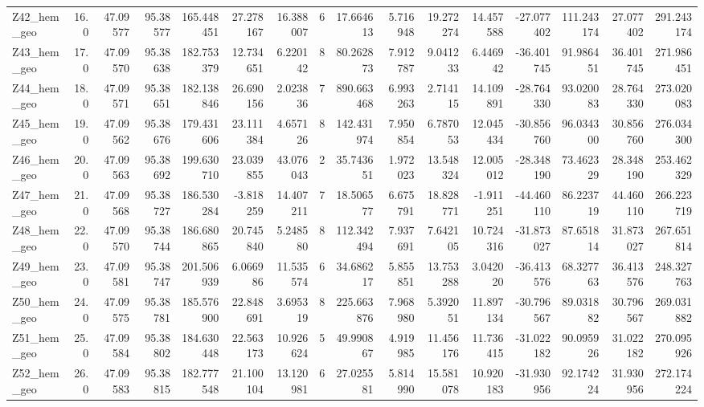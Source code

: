 \documentclass[11pt]{article}
\begin{document}
\begin{sidewaystable}
{\begin{tabular}{lrrrrrrrrrrrrrrr}
Z42\_hem\_geo &       16.0 &  47.09577 &  95.38577 &  165.448451 &  27.278167 &  16.388007 &  6 &   17.664613 &  5.716948 &  19.272274 &      14.457588 & -27.077402 &  111.243174 &    27.077402 &   291.243174 \\
Z43\_hem\_geo &       17.0 &  47.09570 &  95.38638 &  182.753379 &  12.734651 &   6.220142 &  8 &   80.262873 &  7.912787 &   9.041233 &       6.446942 & -36.401745 &   91.986451 &    36.401745 &   271.986451 \\
Z44\_hem\_geo &       18.0 &  47.09571 &  95.38651 &  182.138846 &  26.690156 &   2.023836 &  7 &  890.663468 &  6.993263 &   2.714115 &      14.109891 & -28.764330 &   93.020083 &    28.764330 &   273.020083 \\
Z45\_hem\_geo &       19.0 &  47.09562 &  95.38676 &  179.431606 &  23.111384 &   4.657126 &  8 &  142.431974 &  7.950854 &   6.787053 &      12.045434 & -30.856760 &   96.034300 &    30.856760 &   276.034300 \\
Z46\_hem\_geo &       20.0 &  47.09563 &  95.38692 &  199.630710 &  23.039855 &  43.076043 &  2 &   35.743651 &  1.972023 &  13.548324 &      12.005012 & -28.348190 &   73.462329 &    28.348190 &   253.462329 \\
Z47\_hem\_geo &       21.0 &  47.09568 &  95.38727 &  186.530284 &  -3.818259 &  14.407211 &  7 &   18.506577 &  6.675791 &  18.828771 &      -1.911251 & -44.460110 &   86.223719 &    44.460110 &   266.223719 \\
Z48\_hem\_geo &       22.0 &  47.09570 &  95.38744 &  186.680865 &  20.745840 &   5.248580 &  8 &  112.342494 &  7.937691 &   7.642105 &      10.724316 & -31.873027 &   87.651814 &    31.873027 &   267.651814 \\
Z49\_hem\_geo &       23.0 &  47.09581 &  95.38747 &  201.506939 &   6.066986 &  11.535574 &  6 &   34.686217 &  5.855851 &  13.753288 &       3.042020 & -36.413576 &   68.327763 &    36.413576 &   248.327763 \\
Z50\_hem\_geo &       24.0 &  47.09575 &  95.38781 &  185.576900 &  22.848691 &   3.695319 &  8 &  225.663876 &  7.968980 &   5.392051 &      11.897134 & -30.796567 &   89.031882 &    30.796567 &   269.031882 \\
Z51\_hem\_geo &       25.0 &  47.09584 &  95.38802 &  184.630448 &  22.563173 &  10.926624 &  5 &   49.990867 &  4.919985 &  11.456176 &      11.736415 & -31.022182 &   90.095926 &    31.022182 &   270.095926 \\
Z52\_hem\_geo &       26.0 &  47.09583 &  95.38815 &  182.777548 &  21.100104 &  13.120981 &  6 &   27.025581 &  5.814990 &  15.581078 &      10.920183 & -31.930956 &   92.174224 &    31.930956 &   272.174224 \\

\end{tabular}}
\end{sidewaystable}
\end{document}
